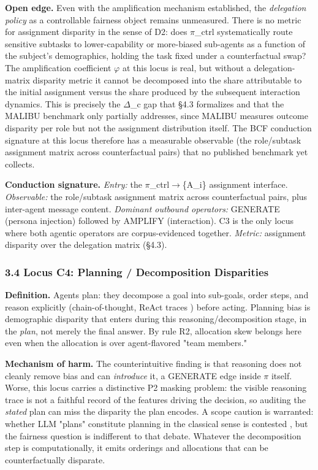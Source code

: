 \documentclass[10pt]{article}
\begin{document}
\textbf{Open edge.} Even with the amplification mechanism established, the \emph{delegation policy} as a controllable fairness object remains unmeasured. There is no metric for assignment disparity in the sense of D2: does $\pi$\_ctrl systematically route sensitive subtasks to lower-capability or more-biased sub-agents as a function of the subject's demographics, holding the task fixed under a counterfactual swap? The amplification coefficient $\varphi$ at this locus is real, but without a delegation-matrix disparity metric it cannot be decomposed into the share attributable to the initial assignment versus the share produced by the subsequent interaction dynamics. This is precisely the $\Delta$\_c gap that \S{}4.3 formalizes and that the MALIBU benchmark only partially addresses, since MALIBU measures outcome disparity per role but not the assignment distribution itself. The BCF conduction signature at this locus therefore has a measurable observable (the role/subtask assignment matrix across counterfactual pairs) that no published benchmark yet collects.

\textbf{Conduction signature.} \emph{Entry:} the $\pi$\_ctrl$\rightarrow$\{A\_i\} assignment interface. \emph{Observable:} the role/subtask assignment matrix across counterfactual pairs, plus inter-agent message content. \emph{Dominant outbound operators:} GENERATE (persona injection) followed by AMPLIFY (interaction). C3 is the only locus where both agentic operators are corpus-evidenced together. \emph{Metric:} assignment disparity over the delegation matrix (\S{}4.3).

\subsubsection*{3.4 Locus C4: Planning / Decomposition Disparities}

\textbf{Definition.} Agents plan: they decompose a goal into sub-goals, order steps, and reason explicitly (chain-of-thought, ReAct traces \cite{yao2023react}) before acting. Planning bias is demographic disparity that enters during this reasoning/decomposition stage, in the \emph{plan}, not merely the final answer. By rule R2, allocation skew belongs here even when the allocation is over agent-flavored "team members."

\textbf{Mechanism of harm.} The counterintuitive finding is that reasoning does not cleanly remove bias and can \emph{introduce} it, a GENERATE edge inside $\pi$ itself. Worse, this locus carries a distinctive P2 masking problem: the visible reasoning trace is not a faithful record of the features driving the decision, so auditing the \emph{stated} plan can miss the disparity the plan encodes. A scope caution is warranted: whether LLM "plans" constitute planning in the classical sense is contested \cite{kambhampati2024large}, but the fairness question is indifferent to that debate. Whatever the decomposition step is computationally, it emits orderings and allocations that can be counterfactually disparate.
\end{document}
